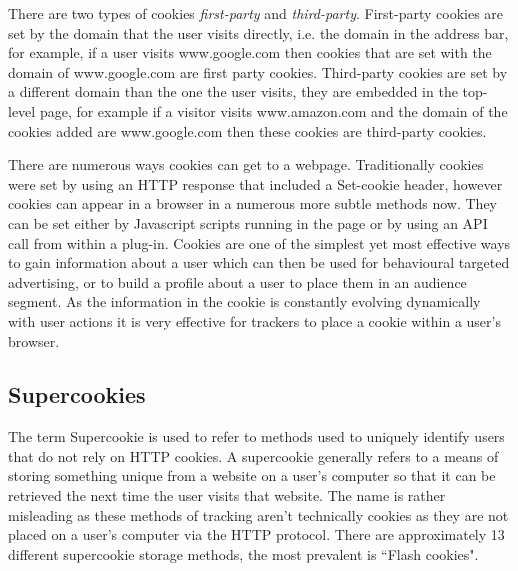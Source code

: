\documentclass[12pt]{article}
\begin{document}
There are two types of cookies \textit{first-party} and \textit{third-party}. First-party cookies are set by the domain that the user visits directly, i.e. the domain in the address bar, for example, if a user visits www.google.com then cookies that are set with the domain of www.google.com are first party cookies. Third-party cookies are set by a different domain than the one the user visits, they are embedded in the top-level page, for example if a visitor visits www.amazon.com and the domain of the cookies added are www.google.com then these cookies are third-party cookies. \newline

There are numerous ways cookies can get to a webpage. Traditionally cookies were set by using an HTTP response that included a Set-cookie header, however cookies can appear in a browser in a numerous more subtle methods now. They can be set either by Javascript scripts running in the page or by using an API call from within a plug-in. Cookies are one of the simplest yet most effective ways to gain information about a user which can then be used for behavioural targeted advertising, or to build a profile about a user to place them in an audience segment. As the information in the cookie is constantly evolving dynamically with user actions it is very effective for trackers to place a cookie within a user's browser. 

\subsection{Supercookies} \label{Supercookies}
The term Supercookie is used to refer to methods used to uniquely identify users that do not rely on HTTP cookies. A supercookie generally refers to a means of storing something unique from a website on a user's computer so that it can be retrieved the next time the user visits that website. The name is rather misleading as these methods of tracking aren't technically cookies as they are not placed on a user's computer via the HTTP protocol. There are approximately 13 different supercookie storage methods, the most prevalent is ``Flash cookies". \newline 
\end{document}
